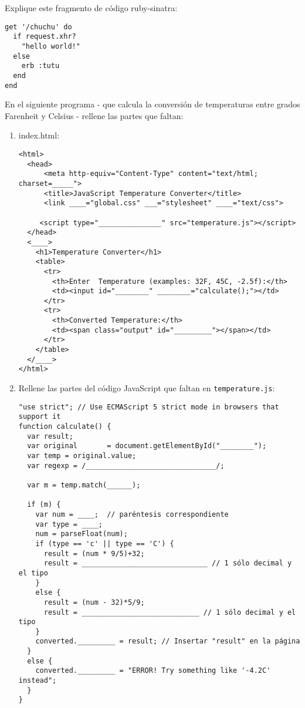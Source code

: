 \item Explique este fragmento de código ruby-sinatra:
\label{sinatrachuchu}
\begin{verbatim}
get '/chuchu' do
  if request.xhr? 
    "hello world!"
  else 
    erb :tutu
  end
end
\end{verbatim}
\item  En el siguiente programa - que calcula la conversión
de temperaturas entre grados Farenheit y Celsius - rellene las partes que faltan:
\begin{enumerate}
\item  index.html:
\begin{verbatim}
<html>
  <head>
      <meta http-equiv="Content-Type" content="text/html; charset=_____">
      <title>JavaScript Temperature Converter</title>
      <link ____="global.css" ___="stylesheet" ____="text/css">

     <script type="_______________" src="temperature.js"></script>
  </head>
  <____>
    <h1>Temperature Converter</h1>
    <table>
      <tr>
        <th>Enter  Temperature (examples: 32F, 45C, -2.5f):</th>
        <td><input id="________" ________="calculate();"></td>
      </tr>
      <tr>
        <th>Converted Temperature:</th>
        <td><span class="output" id="_________"></span></td>
      </tr>
    </table>
  </____>
</html>
\end{verbatim}

\item Rellene las partes del código JavaScript que faltan en \verb|temperature.js|:
\begin{verbatim}
"use strict"; // Use ECMAScript 5 strict mode in browsers that support it
function calculate() {
  var result;
  var original       = document.getElementById("________");
  var temp = original.value;
  var regexp = /_______________________________/;
  
  var m = temp.match(______);
  
  if (m) {
    var num = ____;  // paréntesis correspondiente
    var type = ____;
    num = parseFloat(num);
    if (type == 'c' || type == 'C') {
      result = (num * 9/5)+32;
      result = ______________________________ // 1 sólo decimal y el tipo
    }
    else {
      result = (num - 32)*5/9;
      result = ____________________________ // 1 sólo decimal y el tipo
    }
    converted._________ = result; // Insertar "result" en la página
  }
  else {
    converted._________ = "ERROR! Try something like '-4.2C' instead";
  }
}
\end{verbatim}
\end{enumerate}
